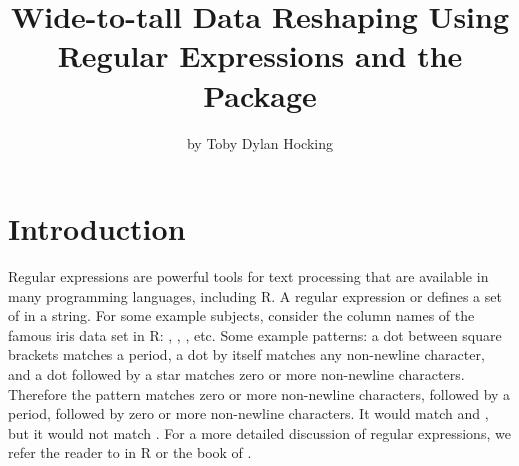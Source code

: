 \newcommand{\sectiontidyr}{Comparisons with other functions for data frames}
\newcommand{\sectiontrackDb}{Capturing all matches from a multi-line text file}
\newcommand{\sectiontimings}{Comparing computation times of R regex packages}
\newcommand{\sectiondf}{Creating new columns from character columns in a data frame}
\newcommand{\sectionrex}{Comparing \pkg{namedCapture} variable argument syntax with \pkg{rex}}
\newcommand{\sectioncomparisons}{Comparisons with other R packages}

\title{Wide-to-tall Data Reshaping Using Regular Expressions and the
   Package}

\author{by Toby Dylan Hocking}


\maketitle


\section{Introduction}

Regular expressions are powerful tools for text processing that are
available in many programming languages, including R. A regular
expression  or  defines a set of  in a
 string. For some example subjects, consider the column
names of the famous iris data set in R: ,
, , etc. Some example patterns: a
dot between square brackets \code{[.]} matches a period, a dot by
itself  matches any non-newline character, and a dot followed
by a star  matches zero or more non-newline
characters. Therefore the pattern  matches zero or more
non-newline characters, followed by a period, followed by zero or more
non-newline characters. It would match  and
, but it would not match . For a more
detailed discussion of regular expressions, we refer the
reader to  in R or the book of \citet{Friedl2002}.

